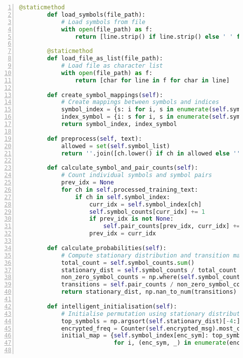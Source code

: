 \documentclass{article}
\begin{document}
\begin{enumerate}
\begin{lstlisting}[language=Python, numbers=left, frame=single, breaklines=true, basicstyle=\small]
        @staticmethod
        def load_symbols(file_path):
            # Load symbols from file
            with open(file_path) as f:
                return [line.strip() if line.strip() else ' ' for line in f]
        
        @staticmethod
        def load_file_as_list(file_path):
            # Load file as character list
            with open(file_path) as f:
                return [char for line in f for char in line]
    
        def create_symbol_mappings(self):
            # Create mappings between symbols and indices
            symbol_index = {s: i for i, s in enumerate(self.symbol_list)}
            index_symbol = {i: s for i, s in enumerate(self.symbol_list)}
            return symbol_index, index_symbol
    
        def preprocess(self, text):
            allowed = set(self.symbol_list)
            return ''.join([ch.lower() if ch in allowed else '' for ch in text]).replace('’', "'").replace('“', '"').replace('”', '"').replace('—', '-').replace('\n', ' ')
    
        def calculate_symbol_and_pair_counts(self):
            # Count individual symbols and symbol pairs
            prev_idx = None
            for ch in self.processed_training_text:
                if ch in self.symbol_index:
                    curr_idx = self.symbol_index[ch]
                    self.symbol_counts[curr_idx] += 1
                    if prev_idx is not None:
                        self.pair_counts[prev_idx, curr_idx] += 1
                    prev_idx = curr_idx
    
        def calculate_probabilities(self):
            # Compute stationary distribution and transition matrix
            total_count = self.symbol_counts.sum()
            stationary_dist = self.symbol_counts / total_count
            non_zero_symbol_counts = np.where(self.symbol_counts == 0, 1, self.symbol_counts)
            transitions = self.pair_counts / non_zero_symbol_counts[:, None]
            return stationary_dist, np.nan_to_num(transitions)
    
        def intelligent_initialisation(self):
            # Initialise permutation using stationary distribution
            top_symbols = np.argsort(self.stationary_dist)[-4:][::-1]
            encrypted_freq = Counter(self.encrypted_msg).most_common(4)
            initial_map = {self.symbol_index[enc_sym]: top_symbols[i] 
                           for i, (enc_sym, _) in enumerate(encrypted_freq)}
            

\end{lstlisting}
\end{enumerate}
\end{document}
